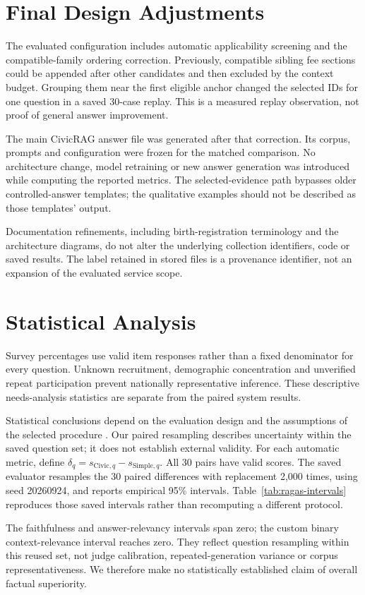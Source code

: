 \section{Final Design Adjustments}
The evaluated configuration includes automatic applicability screening and the compatible-family ordering correction. Previously, compatible sibling fee sections could be appended after other candidates and then excluded by the context budget. Grouping them near the first eligible anchor changed the selected IDs for one question in a saved 30-case replay. This is a measured replay observation, not proof of general answer improvement.

The main CivicRAG answer file was generated after that correction. Its corpus, prompts and configuration were frozen for the matched comparison. No architecture change, model retraining or new answer generation was introduced while computing the reported metrics. The selected-evidence path bypasses older controlled-answer templates; the qualitative examples should not be described as those templates' output.

Documentation refinements, including birth-registration terminology and the architecture diagrams, do not alter the underlying collection identifiers, code or saved results. The label retained in stored files is a provenance identifier, not an expansion of the evaluated service scope.

\section{Statistical Analysis}
Survey percentages use valid item responses rather than a fixed denominator for every question. Unknown recruitment, demographic concentration and unverified repeat participation prevent nationally representative inference. These descriptive needs-analysis statistics are separate from the paired system results.

Statistical conclusions depend on the evaluation design and the assumptions of the selected procedure \cite{drorstats}. Our paired resampling describes uncertainty within the saved question set; it does not establish external validity. For each automatic metric, define $\delta_q=s_{\mathrm{Civic},q}-s_{\mathrm{Simple},q}$. All 30 pairs have valid scores. The saved evaluator resamples the 30 paired differences with replacement 2,000 times, using seed 20260924, and reports empirical 95\% intervals. Table~\ref{tab:ragas-intervals} reproduces those saved intervals rather than recomputing a different protocol.

The faithfulness and answer-relevancy intervals span zero; the custom binary context-relevance interval reaches zero. They reflect question resampling within this reused set, not judge calibration, repeated-generation variance or corpus representativeness. We therefore make no statistically established claim of overall factual superiority.

